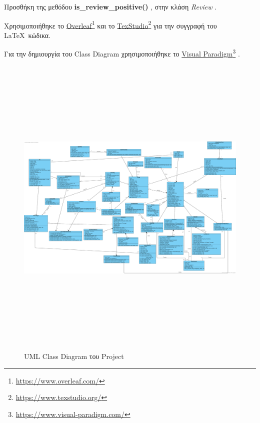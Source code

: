 \documentclass{../ol-softwaremanual}
\newcommand{\doclink}[2]{\href{#1}{#2}\footnote{\url{#1}}}
\begin{document}
	Προσθήκη της μεθόδου \en \textbf{is\_review\_positive()} \gr, στην κλάση \en \textit{Review} \gr.

	\vspace{20pt}
	
	\newpage 
	
	
	
	\vspace{20pt}
	\flushleft
	Χρησιμοποιήθηκε το \en \doclink{https://www.overleaf.com/}{Overleaf} \gr και το \en \doclink{https://www.texstudio.org/}{TexStudio} \gr για την συγγραφή του \LaTeX\ κώδικα. \break
	
	Για την δημιουργία του \en Class Diagram \gr χρησιμοποιήθηκε το \en \doclink{https://www.visual-paradigm.com/}{Visual Paradigm} \gr .
	
	\newpage
	
	
	\begin{figure}[htbp!]		
		\includegraphics[width=\textwidth+3.4cm, height=15cm]{img/class_diagram_v0.2.png}
		\caption{\en UML Class Diagram \gr του \en Project \gr}
	\end{figure}
	
\end{document}
